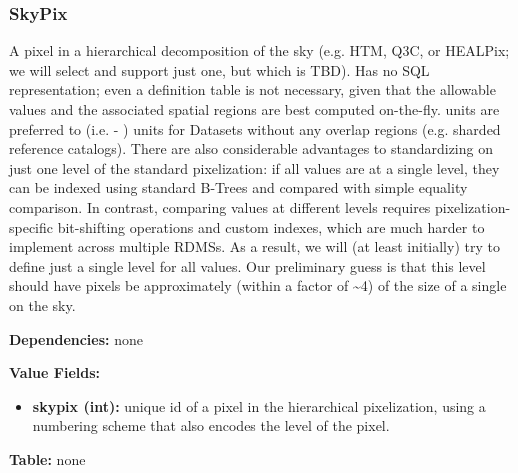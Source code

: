 \subsubsection{SkyPix}
\label{unit:SkyPix}

A pixel in a hierarchical decomposition of the sky (e.g. HTM, Q3C, or
HEALPix; we will select and support just one, but which is TBD). Has
no SQL representation; even a definition table is not necessary, given
that the allowable values and the associated spatial regions are best
computed on-the-fly.   units are preferred to
 (i.e. - ) units for
Datasets without any overlap regions (e.g. sharded reference
catalogs). There are also considerable advantages to standardizing on
just one level of the standard pixelization: if all 
values are at a single level, they can be indexed using standard
B-Trees and compared with simple equality comparison.  In contrast,
comparing  values at different levels requires
pixelization- specific bit-shifting operations and custom indexes,
which are much harder to implement across multiple RDMSs.  As a
result, we will (at least initially) try to define just a single level
for all  values.  Our preliminary guess is that this
level should have pixels be approximately (within a factor of
\textasciitilde{}4) of the size of a single  on the
sky.

\textbf{Dependencies:} none

\textbf{Value Fields:}
\begin{itemize}
  \item \textbf{skypix (int):}
      unique id of a pixel in the hierarchical pixelization, using a
      numbering scheme that also encodes the level of the pixel.
\end{itemize}

\textbf{Table:} none
